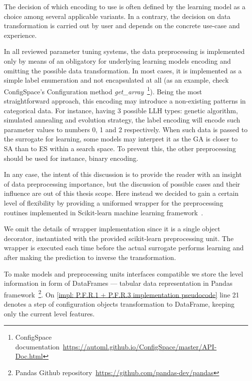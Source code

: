 The decision of which encoding to use is often defined by the learning model as a choice among several applicable variants. In a contrary, the decision on data transformation is carried out by user and depends on the concrete use-case and experience.

In all reviewed parameter tuning systems, the data preprocessing is implemented only by means of an obligatory for underlying learning models encoding and omitting the possible data transformation. In most cases, it is implemented as a simple label enumeration and not encapsulated at all (as an example, check ConfigSpace's Configuration method \emph{get\_array}~\footnote{ConfigSpace documentation~\url{https://automl.github.io/ConfigSpace/master/API-Doc.html}}). Being the most straightforward approach, this encoding may introduce a non-existing patterns in categorical data. For instance, having 3 possible LLH types: genetic algorithm, simulated annealing and evolution strategy, the label encoding will encode such parameter values to numbers 0, 1 and 2 respectively. When such data is passed to the surrogate for learning, some models may interpret it as the GA is closer to SA than to ES within a search space. To prevent this, the other preprocessing should be used for instance, binary encoding.

In any case, the intent of this discussion is to provide the reader with an insight of data preprocessing importance, but the discussion of possible cases and their influence are out of this thesis scope. Here instead we decided to gain a certain level of flexibility by providing a uniformed wrapper for the preprocessing routines implemented in Scikit-learn machine learning framework~\cite{scikit-learn}.

We omit the details of wrapper implementation since it is a single object decorator, instantiated with the provided scikit-learn preprocessing unit. The wrapper is executed each time before the actual surrogate performs learning and after making the prediction to inverse the transformation.

To make models and preprocessing units interfaces compatible we store the level information in form of DataFrames — tabular data representation in Pandas framework~\footnote{Pandas Github repository~\url{https://github.com/pandas-dev/pandas}}. On \cref{impl: P.F.R.1 + P.F.R.3 implementation pseudocode} line 21 denotes a step of configuration objects transformation to DataFrame, keeping only the current level features.


